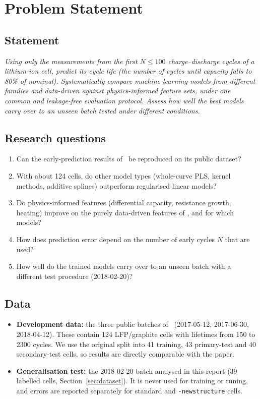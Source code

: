 \section{Problem Statement}
\label{sec:problem}

\subsection{Statement}
\textit{Using only the measurements from the first $N\le100$
charge--discharge cycles of a lithium-ion cell, predict its cycle life
(the number of cycles until capacity falls to 80\% of nominal).
Systematically compare machine-learning models from different families and
data-driven against physics-informed feature sets, under one common and
leakage-free evaluation protocol. Assess how well the best models carry
over to an unseen batch tested under different conditions.}

\subsection{Research questions}
\begin{enumerate}
  \item[\textbf{RQ1}] Can the early-prediction results of~\cite{severson2019}
  be reproduced on its public dataset?
  \item[\textbf{RQ2}] With about 124 cells, do other model types (whole-curve
  PLS, kernel methods, additive splines) outperform regularised linear models?
  \item[\textbf{RQ3}] Do physics-informed features (differential capacity,
  resistance growth, heating) improve on the purely data-driven features of
  \cite{severson2019}, and for which models?
  \item[\textbf{RQ4}] How does prediction error depend on the number of early
  cycles $N$ that are used?
  \item[\textbf{RQ5}] How well do the trained models carry over to an unseen
  batch with a different test procedure (2018-02-20)?
\end{enumerate}

\subsection{Data}
\begin{itemize}
  \item \textbf{Development data:} the three public batches
  of~\cite{severson2019,matr_data} (2017-05-12, 2017-06-30, 2018-04-12).
  These contain 124 LFP/graphite cells with lifetimes from 150 to 2300
  cycles. We use the original split into 41 training, 43 primary-test and
  40 secondary-test cells, so results are directly comparable with the
  paper.
  \item \textbf{Generalisation test:} the 2018-02-20 batch analysed in this
  report (39 labelled cells, Section~\ref{sec:dataset}). It is never used
  for training or tuning, and errors are reported separately for standard
  and \texttt{-newstructure} cells.
\end{itemize}

